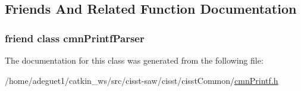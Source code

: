 \subsection{Friends And Related Function Documentation}
\hypertarget{classcmn_printf_a73ad898e5a1725bb1c99d1bccadf68b2}{
\subsubsection[{cmn\-Printf\-Parser}]{\setlength{\rightskip}{0pt plus 5cm}friend class {\bf cmn\-Printf\-Parser}\hspace{0.3cm}{\ttfamily [friend]}}}\label{classcmn_printf_a73ad898e5a1725bb1c99d1bccadf68b2}


The documentation for this class was generated from the following file\-:\begin{DoxyCompactItemize}
\item 
/home/adeguet1/catkin\-\_\-ws/src/cisst-\/saw/cisst/cisst\-Common/\hyperlink{cmn_printf_8h}{cmn\-Printf.\-h}\end{DoxyCompactItemize}
